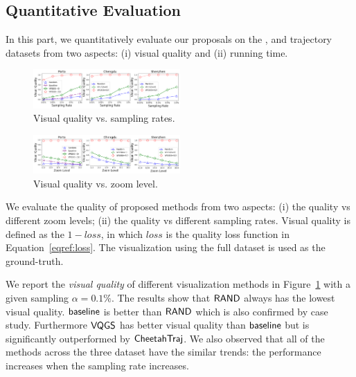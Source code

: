 \subsection{Quantitative Evaluation}\label{sec:quality}
In this part, we quantitatively evaluate our proposals on the \pt{}, \cd{} and \sz{} trajectory datasets from two aspects:
(i) visual quality and (ii) running time.



\begin{figure}[t]
	\centering
	\includegraphics[width=0.5\textwidth]{pictures/quantitative_study_icde/sample_quality.png}
	\vspace{-8mm}
	\caption{Visual quality vs. sampling rates.}
	\label{fig:sample_quality}
	\vspace{-3mm}
\end{figure}

\begin{figure}[t]
	\centering
	\includegraphics[width=0.5\textwidth]{pictures/quantitative_study_icde/zoom_quality.png}
	\vspace{-8mm}
	\caption{Visual quality vs. zoom level.}
	\label{fig:zoom_quality}
	\vspace{-3mm}
\end{figure}

We evaluate the quality of proposed methods from two aspects: (i) the quality vs different zoom levels; (ii) the quality vs different sampling rates.
Visual quality is defined as the $1-loss$, in which $loss$ is the quality loss function in Equation~\eqref{eqref:loss}. The visualization using the full dataset is used as the ground-truth. 


We report the \textit{visual quality} of different visualization methods in Figure~\ref{fig:sample_quality} with a given sampling $\alpha=0.1\%$. 
The results show that $\mathsf{RAND}$ always has the lowest visual quality. $\mathsf{baseline}$ is better than $\mathsf{RAND}$ which is also confirmed by case study. Furthermore $\mathsf{VQGS}$ has better visual quality than $\mathsf{baseline}$ but is significantly outperformed by $\mathsf{CheetahTraj}$. We also observed that all of the methods across the three dataset have the similar trends: the performance increases when the sampling rate increases.

